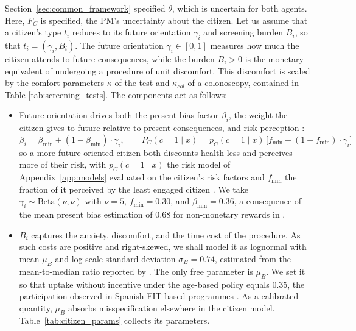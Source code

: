 \documentclass[12pt]{article}
\begin{document}
Section~\ref{sec:common_framework} specified $\theta$, which is uncertain for both agents. Here, $F_C$ is specified, the PM's uncertainty about the citizen.  Let us assume that a citizen's type $t_i$ reduces to its future orientation $\gamma_i$ and screening burden $B_i$, so that $t_i = (\gamma_i, B_i)$. The future orientation $\gamma_i \in [0,1]$ measures how much the citizen attends to future consequences, while the burden $B_i > 0$ is the monetary equivalent of undergoing a procedure of unit discomfort. This discomfort is scaled by the comfort parameters $\kappa$ of the test and $\kappa_{col}$ of a colonoscopy, contained in Table \ref{tab:screening_tests}. The components act as follows:
\begin{itemize}
    \item Future orientation drives both the present-bias factor $\beta_i$, the weight the citizen gives to future relative to present consequences, and risk perception \citep{huf2021text}:
    \begin{equation*}
        \beta_i = \beta_{\min} + (1 - \beta_{\min}) \cdot \gamma_i, \qquad P_C(c=1 \mid x) = p_{C}(c=1 \mid x)\, \big[f_{\min} + (1 - f_{\min})\cdot \gamma_i\big]
    \end{equation*}
    so a more future-oriented citizen both discounts health less and perceives more of their risk, with $p_{C}(c = 1 \mid x)$ the risk model of Appendix~\ref{app:models} evaluated on the citizen's risk factors and $f_{\min}$ the fraction of it perceived by the least engaged citizen \citep{le2023exploring}. We take $\gamma_i \sim \mathrm{Beta}(\nu,\nu)$ with $\nu = 5$, $f_{\min} = 0.30$, and $\beta_{\min}=0.36$, a consequence of the mean present bias estimation of $0.68$ for non-monetary rewards in \citet{cheung2026meta}.
    \item $B_i$ captures the anxiety, discomfort, and the time cost of the procedure. As such costs are positive and right-skewed, we shall model it as lognormal with mean $\mu_B$ and log-scale standard deviation $\sigma_B = 0.74$, estimated from the mean-to-median ratio reported by \citet{jonas2010willingness}. The only free parameter is $\mu_B$. We set it so that uptake without incentive under the age-based policy equals $0.35$, the participation observed in Spanish FIT-based programmes \citep{binefa2016colorectal, portero2023uptake}. As a calibrated quantity, $\mu_B$ absorbs misspecification elsewhere in the citizen model. Table~\ref{tab:citizen_params} collects its parameters. 
\end{itemize}
\end{document}
